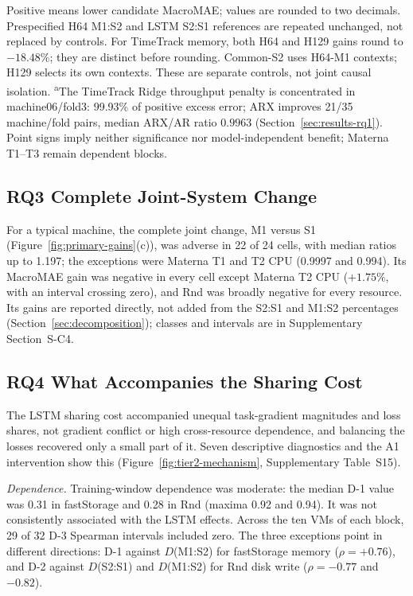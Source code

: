 \documentclass[5p,twocolumn]{elsarticle}
\begin{document}
\begin{table}[t]
\begin{tabular*}{\textwidth}{@{\extracolsep{\fill}}lrrrr@{}}
  \end{tabular*}
  \vspace{2pt}
  \parbox{\textwidth}{\footnotesize Positive means lower candidate MacroMAE; values are rounded to two decimals.
  Prespecified H64 M1:S2 and LSTM S2:S1 references are repeated unchanged, not replaced by controls.
  For TimeTrack memory, both H64 and H129 gains round to $-18.48\%$; they are distinct before rounding.
  Common-S2 uses H64-M1 contexts; H129 selects its own contexts. These are separate controls, not joint causal isolation.
  \textsuperscript{a}The TimeTrack Ridge throughput penalty is concentrated in machine06/fold3:
  99.93\% of positive excess error; ARX improves 21/35 machine/fold pairs, median ARX/AR ratio $0.9963$ (Section~\ref{sec:results-rq1}).
  Point signs imply neither significance nor model-independent benefit; Materna T1--T3 remain dependent blocks.}
\end{table}

\subsection{RQ3 Complete Joint-System Change}
\label{sec:results-rq3}

For a typical machine, the complete joint change, M1 versus S1
(Figure~\ref{fig:primary-gains}(c)), was adverse in 22 of 24 cells, with
median ratios up to 1.197; the exceptions were Materna T1 and T2 CPU (0.9997
and 0.994). Its MacroMAE gain was negative in every cell except Materna T2
CPU ($+1.75\%$, with an interval crossing zero), and Rnd was broadly negative
for every resource. Its gains are reported directly, not added from the S2:S1 and M1:S2 percentages
(Section~\ref{sec:decomposition}); classes and intervals are in Supplementary
Section~S-C4.

\subsection{RQ4 What Accompanies the Sharing Cost}
\label{sec:results-diagnostics}

The LSTM sharing cost accompanied unequal task-gradient magnitudes and loss
shares, not gradient conflict or high cross-resource dependence, and balancing
the losses recovered only a small part of it. Seven descriptive diagnostics
and the A1 intervention show this (Figure~\ref{fig:tier2-mechanism},
Supplementary Table~S15).

\emph{Dependence.} Training-window dependence was moderate: the median D-1
value was 0.31 in fastStorage and 0.28 in Rnd (maxima 0.92 and 0.94). It was
not consistently associated with the LSTM effects. Across the ten VMs of
each block, 29 of 32 D-3 Spearman intervals included zero. The three
exceptions point in different directions: D-1 against $D$(M1:S2) for
fastStorage memory ($\rho=+0.76$), and D-2 against $D$(S2:S1) and
$D$(M1:S2) for Rnd disk write ($\rho=-0.77$ and $-0.82$).
\end{document}
